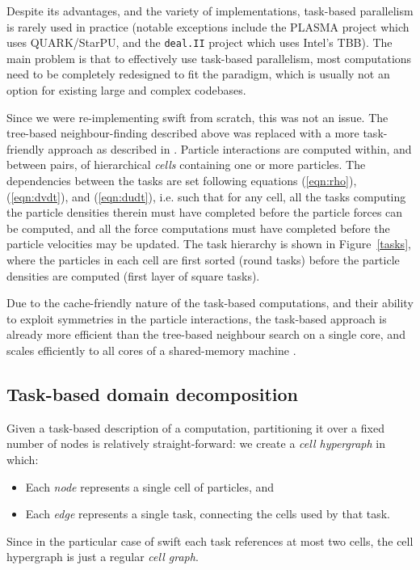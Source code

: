 \documentclass{sig-alternate-05-2015}
\newcommand{\eqn}[1] {(\ref{eqn:#1})}
\newcommand{\swift}{{\sc swift}\xspace}
\begin{document}
Despite its advantages, and the variety of implementations,
task-based parallelism is rarely used in
practice (notable exceptions include the PLASMA project
\cite{ref:Agullo2009} which uses QUARK/StarPU, and the {\tt deal.II} project
\cite{ref:Bangerth2007} which uses Intel's TBB).
The main problem is that to effectively use task-based parallelism,
most computations need to be completely redesigned to fit the paradigm,
which is usually not an option for existing large and complex codebases.

Since we were re-implementing \swift from scratch, this was not an issue.
The tree-based neighbour-finding described above was replaced with a more
task-friendly approach as described in \cite{gonnet2015efficient}.
Particle interactions are computed within, and between pairs, of
hierarchical {\em cells} containing one or more particles.
The dependencies between the tasks are set following
equations \eqn{rho}, \eqn{dvdt}, and \eqn{dudt}, i.e. such that for any cell,
all the tasks computing the particle densities therein must have
completed before the particle forces can be computed, and all the
force computations must have completed before the particle velocities
may be updated.
The task hierarchy is shown in Figure~\ref{tasks}, where the particles in each
cell are first sorted (round tasks) before the particle densities
are computed (first layer of square tasks).

Due to the cache-friendly nature of the task-based computations, 
and their ability to exploit symmetries in the particle interactions,
the task-based approach is already more efficient than the tree-based
neighbour search on a single core, and scales efficiently to all
cores of a shared-memory machine \cite{gonnet2015efficient}.


\subsection{Task-based domain decomposition}

Given a task-based description of a computation, partitioning it over
a fixed number of nodes is relatively straight-forward: we create
a {\em cell hypergraph} in which:
\begin{itemize}
  \item Each {\em node} represents a single cell of particles, and
  \item Each {\em edge} represents a single task, connecting the
    cells used by that task.
\end{itemize}
Since in the particular case of \swift each task references at most
two cells, the cell hypergraph is just a regular {\em cell graph}.
\end{document}
